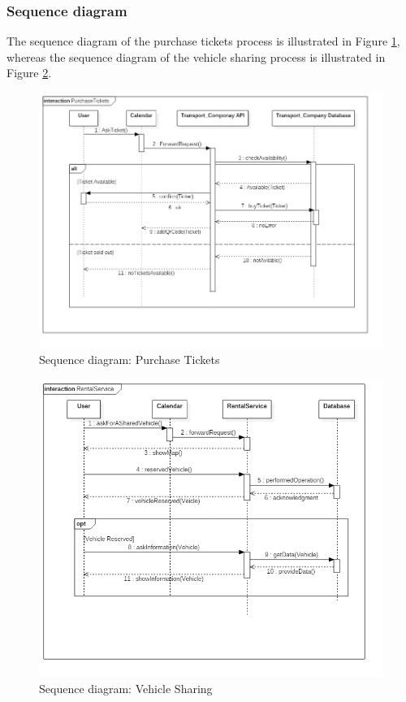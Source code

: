 \subsubsection{Sequence diagram}
The sequence diagram of the purchase tickets process is illustrated in Figure \ref{fig:seqPurchaseTickets}, whereas the sequence diagram of the vehicle sharing process is illustrated in Figure \ref{fig:seqVehicleSharing}.
\begin{figure}
	\centering
	\includegraphics[width=6in]{./diagrams/PurchaseTickets.png}
	\caption{Sequence diagram: Purchase Tickets}
	\label{fig:seqPurchaseTickets}
\end{figure}

\begin{figure}
	\centering
    \includegraphics[width=6in]{./diagrams/RentalService.png}
    \caption{Sequence diagram: Vehicle Sharing}
    \label{fig:seqVehicleSharing}
\end{figure}


